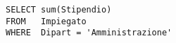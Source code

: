 \begin{lstlisting}
SELECT sum(Stipendio)
FROM   Impiegato
WHERE  Dipart = 'Amministrazione'
\end{lstlisting}

